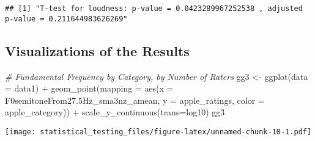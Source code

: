 \documentclass[
]{article}
\newenvironment{Shaded}{\begin{snugshade}}{\end{snugshade}}
\newcommand{\AttributeTok}[1]{\textcolor[rgb]{0.77,0.63,0.00}{#1}}
\newcommand{\CommentTok}[1]{\textcolor[rgb]{0.56,0.35,0.01}{\textit{#1}}}
\newcommand{\DecValTok}[1]{\textcolor[rgb]{0.00,0.00,0.81}{#1}}
\newcommand{\FloatTok}[1]{\textcolor[rgb]{0.00,0.00,0.81}{#1}}
\newcommand{\FunctionTok}[1]{\textcolor[rgb]{0.00,0.00,0.00}{#1}}
\newcommand{\NormalTok}[1]{#1}
\newcommand{\OtherTok}[1]{\textcolor[rgb]{0.56,0.35,0.01}{#1}}
\newcommand{\SpecialCharTok}[1]{\textcolor[rgb]{0.00,0.00,0.00}{#1}}
\newcommand{\StringTok}[1]{\textcolor[rgb]{0.31,0.60,0.02}{#1}}
\begin{document}
\begin{Shaded}
\end{Shaded}

\begin{verbatim}
## [1] "T-test for loudness: p-value = 0.0423289967252538 , adjusted p-value = 0.211644983626269"
\end{verbatim}

\hypertarget{visualizations-of-the-results}{%
\subsection{Visualizations of the
Results}\label{visualizations-of-the-results}}

\begin{Shaded}
\begin{Highlighting}[]
\CommentTok{\# Fundamental Frequency by Category, by Number of Raters}
\NormalTok{gg3 }\OtherTok{\textless{}{-}} \FunctionTok{ggplot}\NormalTok{(}\AttributeTok{data =}\NormalTok{ data1) }\SpecialCharTok{+}
  \FunctionTok{geom\_point}\NormalTok{(}\AttributeTok{mapping =} \FunctionTok{aes}\NormalTok{(}\AttributeTok{x =}\NormalTok{ F0semitoneFrom27}\FloatTok{.5}\NormalTok{Hz\_sma3nz\_amean, }\AttributeTok{y =}\NormalTok{ apple\_ratings, }\AttributeTok{color =}\NormalTok{ apple\_category)) }\SpecialCharTok{+}
  \FunctionTok{scale\_y\_continuous}\NormalTok{(}\AttributeTok{trans=}\StringTok{\textquotesingle{}log10\textquotesingle{}}\NormalTok{)}
\NormalTok{gg3}
\end{Highlighting}
\end{Shaded}

\texttt{[image: statistical\_testing\_files/figure-latex/unnamed-chunk-10-1.pdf]}
\end{document}
